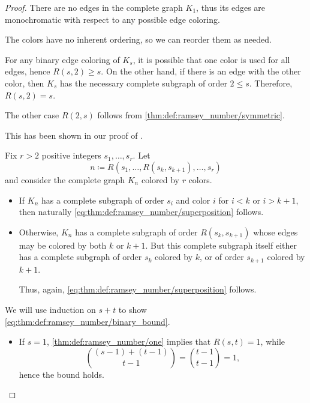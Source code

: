 \begin{proof}
   There are no edges in the complete graph \( K_1 \), thus its edges are monochromatic with respect to any possible edge coloring.

   The colors have no inherent ordering, so we can reorder them as needed.

   For any binary edge coloring of \( K_s \), it is possible that one color is used for all edges, hence \( R(s, 2) \geq s \). On the other hand, if there is an edge with the other color, then \( K_s \) has the necessary complete subgraph of order \( 2 \leq s \). Therefore, \( R(s, 2) = s \).

  The other case \( R(2, s) \) follows from \cref{thm:def:ramsey_number/symmetric}.

   This has been shown in our proof of .

   Fix \( r > 2 \) positive integers \( s_1, \ldots, s_r \). Let
  \begin{equation*}
    n \coloneqq R(s_1, \ldots, R(s_k, s_{k+1}), \ldots, s_r)
  \end{equation*}
  and consider the complete graph \( K_n \) colored by \( r \) colors.

  \begin{itemize}
    \item If \( K_n \) has a complete subgraph of order \( s_i \) and color \( i \) for \( i < k \) or \( i > k + 1 \), then naturally \eqref{eq:thm:def:ramsey_number/superposition} follows.

    \item Otherwise, \( K_n \) has a complete subgraph of order \( R(s_k, s_{k+1}) \) whose edges may be colored by both \( k \) or \( k + 1 \). But this complete subgraph itself either has a complete subgraph of order \( s_k \) colored by \( k \), or of order \( s_{k+1} \) colored by \( k + 1 \).

    Thus, again, \eqref{eq:thm:def:ramsey_number/superposition} follows.
  \end{itemize}

   We will use induction on \( s + t \) to show \eqref{eq:thm:def:ramsey_number/binary_bound}.
  \begin{itemize}
    \item If \( s = 1 \), \cref{thm:def:ramsey_number/one} implies that \( R(s, t) = 1 \), while
    \begin{equation*}
      \binom { (s - 1) + (t - 1) } {t - 1} = \binom { t - 1 } { t - 1 } = 1,
    \end{equation*}
    hence the bound holds.


\end{itemize}
\end{proof}
